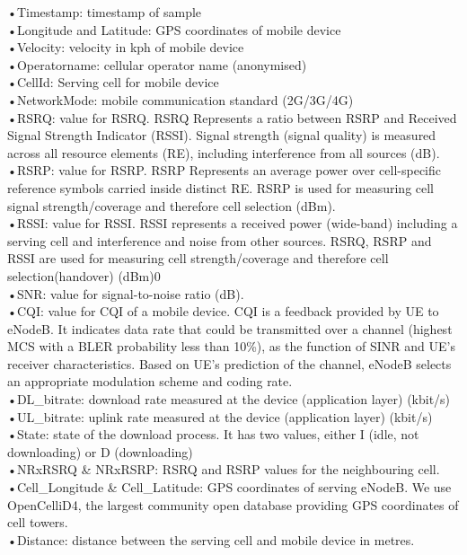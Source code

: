 •Timestamp: timestamp of sample \\
•Longitude and Latitude: GPS coordinates of mobile device \\
•Velocity: velocity in kph of mobile device \\ 
•Operatorname: cellular operator name (anonymised) \\
•CellId: Serving cell for mobile device \\
•NetworkMode: mobile communication standard (2G/3G/4G) \\
•RSRQ: value for RSRQ. RSRQ Represents a ratio between RSRP and Received Signal Strength Indicator (RSSI). Signal strength (signal quality) is measured across all resource elements (RE), including interference from all sources (dB). \\
•RSRP: value for RSRP. RSRP Represents an average power over cell-specific reference symbols carried inside distinct RE. RSRP is used for measuring cell signal strength/coverage and therefore cell selection (dBm). \\
•RSSI: value for RSSI. RSSI represents a received power (wide-band) including a serving cell and interference and noise from other sources. RSRQ, RSRP and RSSI are used for measuring cell strength/coverage and therefore cell selection(handover) (dBm)0\\
•SNR: value for signal-to-noise ratio (dB). \\
•CQI: value for CQI of a mobile device. CQI is a feedback provided by UE to eNodeB. It indicates data rate that could be transmitted over a channel (highest MCS with a BLER probability less than 10\%), as the function of SINR and UE’s receiver characteristics. Based on UE’s prediction of the channel, eNodeB selects an appropriate modulation scheme and coding rate. \\
•DL\_bitrate: download rate measured at the device (application layer) (kbit/s) \\
•UL\_bitrate: uplink rate measured at the device (application layer) (kbit/s) \\
•State: state of the download process. It has two values, either I (idle, not downloading) or D (downloading) \\
•NRxRSRQ \& NRxRSRP: RSRQ and RSRP values for the neighbouring cell. \\
•Cell\_Longitude \& Cell\_Latitude: GPS coordinates of serving eNodeB. We use OpenCelliD4, the largest community open database providing GPS coordinates of cell towers. \\
•Distance: distance between the serving cell and mobile device in metres.

